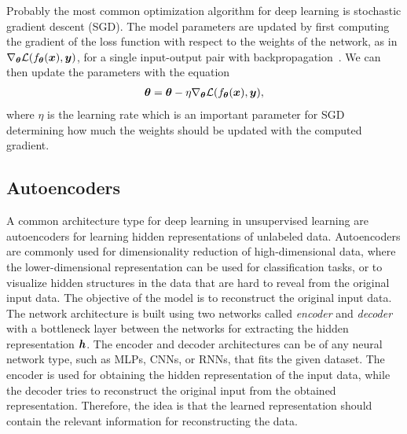 Probably the most common optimization algorithm for deep learning is stochastic gradient descent (SGD). The model parameters are updated by first computing the gradient of the loss function with respect to the weights of the network, as in $\nabla_{{\bm{\theta}}} {\mathcal{L}}(f_{{\bm{\theta}}}({\bm{x}}), {\bm{y}})$, for a single input-output pair with backpropagation~\cite{rumelhart1986learning}. We can then update the parameters with the equation 
\begin{align}\label{eq:weight_update_sgd}
	{\bm{\theta}} = {\bm{\theta}} - \eta \nabla_{{\bm{\theta}}} {\mathcal{L}}(f_{{\bm{\theta}}}({\bm{x}}), {\bm{y}}),
\end{align} 
where $\eta$ is the learning rate which is an important parameter for SGD determining how much the weights should be updated with the computed gradient. 






\subsection{Autoencoders}

A common architecture type for deep learning in unsupervised learning are autoencoders for learning hidden representations of unlabeled data. Autoencoders are commonly used for dimensionality reduction of high-dimensional data, where the lower-dimensional representation can be used for classification tasks, or to visualize hidden structures in the data that are hard to reveal from the original input data. The objective of the model is to reconstruct the original input data. The network architecture is built using two networks called \textit{encoder} and \textit{decoder} with a bottleneck layer between the networks for extracting the hidden representation ${\bm{h}}$. The encoder and decoder architectures can be of any neural network type, such as MLPs, CNNs, or RNNs, that fits the given dataset. The encoder is used for obtaining the hidden representation of the input data, while the decoder tries to reconstruct the original input from the obtained representation. Therefore, the idea is that the learned representation should contain the relevant information for reconstructing the data. 

